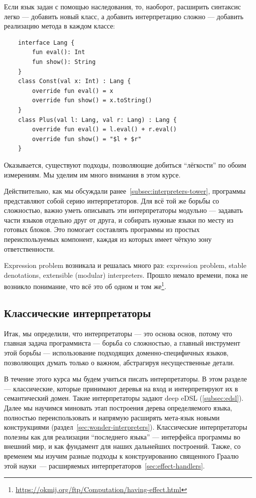 Если язык задан с помощью наследования, то, наоборот, расширить синтаксис легко --- добавить новый класс, а добавить интерпретацию сложно --- добавить реализацию метода в каждом классе:
\begin{verbatim}
    interface Lang {
        fun eval(): Int
        fun show(): String
    }
    class Const(val x: Int) : Lang {
        override fun eval() = x
        override fun show() = x.toString()
    }
    class Plus(val l: Lang, val r: Lang) : Lang {
        override fun eval() = l.eval() + r.eval()
        override fun show() = "$l + $r"
    }
\end{verbatim}

Оказывается, существуют подходы, позволяющие добиться ``лёгкости'' по обоим измерениям.
Мы уделим им много внимания в этом курсе.

Действительно, как мы обсуждали ранее~\ref{subsec:interpreters-tower}, программы представляют собой серию интерпретаторов.
Для всё той же борьбы со сложностью, важно уметь описывать эти интерпретаторы модульно --- задавать части языков отдельно друг от друга, и собирать нужные языки по месту из готовых блоков.
Это помогает составлять программы из простых переиспользуемых компонент, каждая из которых имеет чёткую зону ответственности.

Expression problem возникала и решалась много раз: expression problem, stable denotations, extensible (modular) interpreters.
Прошло немало времени, пока не возникло понимание, что всё это об одном и том же\footnote{\url{https://okmij.org/ftp/Computation/having-effect.html}}.


\subsection{Классические интерпретаторы} \label{sec:classical-interpreters} %

Итак, мы определили, что интерпретаторы --- это основа основ, потому что главная задача программиста --- борьба со сложностью, а главный инструмент этой борьбы --- использование подходящих доменно-специфичных языков, позволяющих думать только о важном, абстрагируя несущественные детали.

В течение этого курса мы будем учиться писать интерпретаторы.
В этом разделе --- классические, которые принимают деревья на вход и интерпретируют их в семантический домен.
Такие интерпретаторы задают deep eDSL (\ref{subsec:edsl}).
Далее мы научимся миновать этап построения дерева определяемого языка, полностью переиспользовать и напрямую расширять мета-язык новыми конструкциями (раздел~\ref{sec:wonder-interpreters}).
Классические интерпретаторы полезны как для реализации ``последнего языка'' --- интерфейса программы во внешний мир, и как фундамент для наших дальнейших построений.
Также, со временем мы изучим разные подходы к конструированию священного Граалю этой науки~--- расширяемых интерпретаторов~\ref{sec:effect-handlers}.

